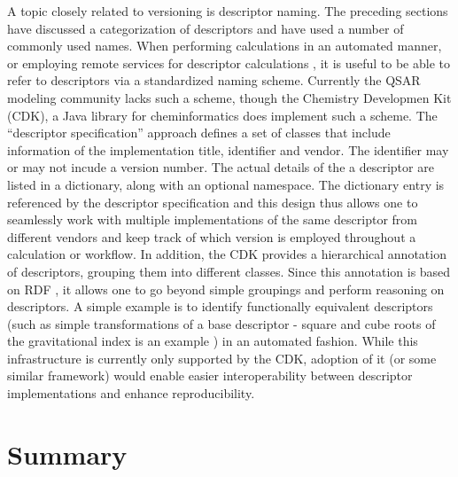 \documentclass[letterpaper, 12pt]{article}
\begin{document}
A topic closely related to versioning is descriptor naming. The
preceding sections have discussed a categorization of descriptors and
have used a number of commonly used names. When performing
calculations in an automated manner, or employing remote services for
descriptor calculations \cite{Dong:2007aa}, it is useful to be able to
refer to descriptors via a standardized naming scheme. Currently the
QSAR modeling community lacks such a scheme, though the Chemistry
Developmen Kit (CDK), a Java library for cheminformatics
\cite{Steinbeck:2006aa} does implement such a scheme. The ``descriptor
specification'' approach defines a set of classes that include
information of the implementation title, identifier and vendor. The
identifier may or may not incude a version number. The actual details
of the a descriptor are listed in a dictionary, along with an optional
namespace. The dictionary entry is referenced by the descriptor
specification and this design thus allows one to seamlessly work with
multiple implementations of the same descriptor from different vendors
and keep track of which version is employed throughout a calculation
or workflow. In addition, the CDK provides a hierarchical annotation
of descriptors, grouping them into different classes. Since this
annotation is based on RDF \cite{Taylor:2006ab}, it allows one to go
beyond simple groupings and perform reasoning on descriptors. A simple
example is to identify functionally equivalent descriptors (such as
simple transformations of a base descriptor - square and cube roots of
the gravitational index is an example \cite{Wessel:1998ve}) in an
automated fashion. While this infrastructure is currently only
supported by the CDK, adoption of it (or some similar framework) would
enable easier interoperability between descriptor implementations and
enhance reproducibility.

\section{Summary}
\label{sec:summary}
\end{document}
